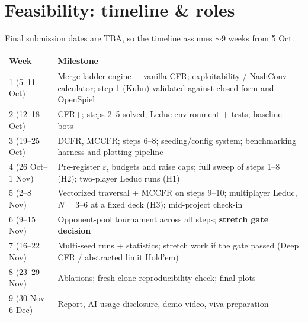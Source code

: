 \documentclass[10pt,a4paper]{article}
\newcommand{\eps}{\varepsilon}
\begin{document}
\section{Feasibility: timeline \& roles}
Final submission dates are TBA, so the timeline assumes ${\sim}9$ weeks from 5 Oct.

\begin{center}\small
\begin{tabularx}{\textwidth}{|l|X|}
\hline
\rowcolor{gray!15}\textbf{Week} & \textbf{Milestone} \\ \hline
1 (5--11 Oct) & Merge ladder engine + vanilla CFR; exploitability / NashConv calculator; step 1 (Kuhn) validated against closed form and OpenSpiel \\ \hline
2 (12--18 Oct) & CFR+; steps 2--5 solved; Leduc environment + tests; baseline bots \\ \hline
3 (19--25 Oct) & DCFR, MCCFR; steps 6--8; seeding/config system; benchmarking harness and plotting pipeline \\ \hline
4 (26 Oct--1 Nov) & Pre-register $\eps$, budgets and raise caps; full sweep of steps 1--8 (H2); two-player Leduc runs (H1) \\ \hline
5 (2--8 Nov) & Vectorized traversal + MCCFR on steps 9--10; multiplayer Leduc, $N = 3$--$6$ at a fixed deck (H3); mid-project check-in \\ \hline
6 (9--15 Nov) & Opponent-pool tournament across all steps; \textbf{stretch gate decision} \\ \hline
7 (16--22 Nov) & Multi-seed runs + statistics; stretch work if the gate passed (Deep CFR / abstracted limit Hold'em) \\ \hline
8 (23--29 Nov) & Ablations; fresh-clone reproducibility check; final plots \\ \hline
9 (30 Nov--6 Dec) & Report, AI-usage disclosure, demo video, viva preparation \\ \hline
\end{tabularx}


\end{center}
\end{document}
